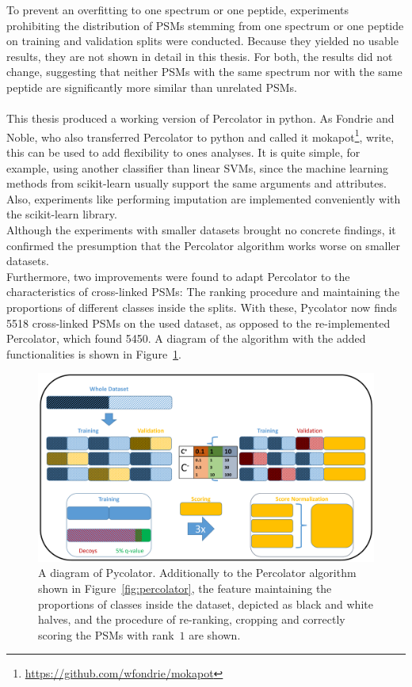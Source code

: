 To prevent an overfitting to one spectrum or one peptide, experiments prohibiting the distribution of PSMs stemming from one spectrum or one peptide on training and validation splits were conducted. Because they yielded no usable results, they are not shown in detail in this thesis. For both, the results did not change, suggesting that neither PSMs with the same spectrum nor with the same peptide are significantly more similar than unrelated PSMs.\\\\
This thesis produced a working version of Percolator in python. As Fondrie and Noble, who also transferred Percolator to python and called it mokapot\footnote{\url{https://github.com/wfondrie/mokapot}}, write, this can be used to add flexibility to ones analyses. It is quite simple, for example, using another classifier than linear SVMs, since the machine learning methods from scikit-learn usually support the same arguments and attributes. Also, experiments like performing imputation are implemented conveniently with the scikit-learn library.\\
Although the experiments with smaller datasets brought no concrete findings, it confirmed the presumption that the Percolator algorithm works worse on smaller datasets.\\
Furthermore, two improvements were found to adapt Percolator to the characteristics of cross-linked PSMs: The ranking procedure and maintaining the proportions of different classes inside the splits. With these, Pycolator now finds 5518 cross-linked PSMs on the used dataset, as opposed to the re-implemented Percolator, which found 5450. A diagram of the algorithm with the added functionalities is shown in Figure~\ref{fig:pycolator}. 
\renewcommand{\baselinestretch}{0.9}
\begin{figure}
	\normalsize
	\centering
	\includegraphics[width = \textwidth, page = 3]{figures/Pycolator_diagram.pdf}
	\caption[Pycolator scheme]{A diagram of Pycolator. Additionally to the Percolator algorithm shown in Figure~\ref{fig:percolator}, the feature maintaining the proportions of classes inside the dataset, depicted as black and white halves, and the procedure of re-ranking, cropping and correctly scoring the PSMs with rank~$1$ are shown.}
	\label{fig:pycolator}
\end{figure}
\renewcommand{\baselinestretch}{1}
